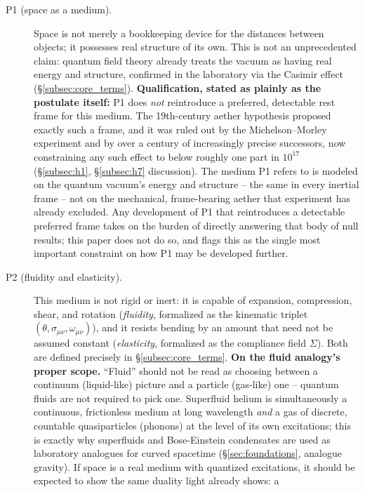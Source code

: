 \documentclass[12pt, a4paper]{article}
\begin{document}
\begin{description}
  \item[P1 (space as a medium).] Space is not merely a bookkeeping
    device for the distances between objects; it possesses real
    structure of its own. This is not an unprecedented claim: quantum
    field theory already treats the vacuum as having real energy and
    structure, confirmed in the laboratory via the Casimir effect
    (\S\ref{subsec:core_terms}). \textbf{Qualification, stated as
    plainly as the postulate itself:} P1 does \emph{not} reintroduce
    a preferred, detectable rest frame for this medium. The
    19th-century aether hypothesis proposed exactly such a frame, and
    it was ruled out by the Michelson--Morley experiment and by over
    a century of increasingly precise successors, now constraining
    any such effect to below roughly one part in $10^{17}$
    (\S\ref{subsec:h1}, \S\ref{subsec:h7} discussion). The medium P1
    refers to is modeled on the quantum vacuum's energy and
    structure -- the same in every inertial frame -- not on the
    mechanical, frame-bearing aether that experiment has already
    excluded. Any development of P1 that reintroduces a detectable
    preferred frame takes on the burden of directly answering that
    body of null results; this paper does not do so, and flags this
    as the single most important constraint on how P1 may be
    developed further.
  \item[P2 (fluidity and elasticity).] This medium is not rigid or
    inert: it is capable of expansion, compression, shear, and
    rotation (\emph{fluidity}, formalized as the kinematic triplet
    $(\theta,\sigma_{\mu\nu},\omega_{\mu\nu})$), and it resists
    bending by an amount that need not be assumed constant
    (\emph{elasticity}, formalized as the compliance field $\Sigma$).
    Both are defined precisely in \S\ref{subsec:core_terms}.
    \textbf{On the fluid analogy's proper scope.} ``Fluid'' should not
    be read as choosing between a continuum (liquid-like) picture and
    a particle (gas-like) one -- quantum fluids are not required to
    pick one. Superfluid helium is simultaneously a continuous,
    frictionless medium at long wavelength \emph{and} a gas of
    discrete, countable quasiparticles (phonons) at the level of its
    own excitations; this is exactly why superfluids and
    Bose-Einstein condensates are used as laboratory analogues for
    curved spacetime (\S\ref{sec:foundations}, analogue gravity). If
    space is a real medium with quantized excitations, it should be
    expected to show the same duality light already shows: a

\end{description}
\end{document}
